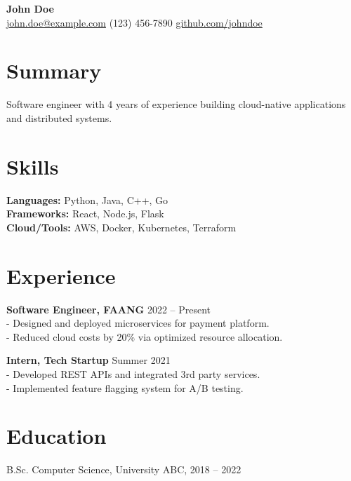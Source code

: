 \documentclass[a4paper,10pt]{article}
\begin{document}
\begin{center}
    {\huge \textbf{John Doe}}\\
    \vspace{3pt}
    \href{mailto:john.doe@example.com}{john.doe@example.com} \quad\textbullet\quad (123) 456-7890 \quad\textbullet\quad \href{https://github.com/johndoe}{github.com/johndoe}
\end{center}

\section*{Summary}
Software engineer with 4 years of experience building cloud-native applications and distributed systems.

\section*{Skills}
\textbf{Languages:} Python, Java, C++, Go \\
\textbf{Frameworks:} React, Node.js, Flask \\
\textbf{Cloud/Tools:} AWS, Docker, Kubernetes, Terraform \\

\section*{Experience}
\textbf{Software Engineer, FAANG} \hfill 2022 -- Present \\
- Designed and deployed microservices for payment platform. \\
- Reduced cloud costs by 20\% via optimized resource allocation.

\textbf{Intern, Tech Startup} \hfill Summer 2021 \\
- Developed REST APIs and integrated 3rd party services. \\
- Implemented feature flagging system for A/B testing.

\section*{Education}
B.Sc. Computer Science, University ABC, 2018 -- 2022
\end{document}
